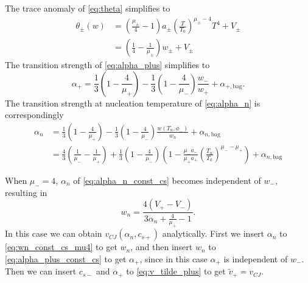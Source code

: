 The trace anomaly of \eqref{eq:theta} simplifies to
\begin{align}
\theta_\pm(w)
&= \left( \frac{\mu_\pm}{4} - 1 \right) a_\pm \left( \frac{T}{T_0} \right)^{\mu_\pm - 4} T^4 + V_\pm \\
&= \left( \frac{1}{4} - \frac{1}{\mu_\pm} \right) w_\pm + V_\pm
\label{eq:theta_const_cs}
\end{align}
The transition strength of \eqref{eq:alpha_plus} simplifies to
\begin{equation}
\alpha_+ = \frac{1}{3} \left( 1 - \frac{4}{\mu_+} \right) - \frac{1}{3} \left(1 - \frac{4}{\mu_-} \right) \frac{w_-}{w_+} + \alpha_{+,\text{bag}}.
\label{eq:alpha_plus_const_cs}
\end{equation}
The transition strength at nucleation temperature of \eqref{eq:alpha_n} is correspondingly
\begin{align}
\alpha_n &= \frac{1}{3} \left( 1 - \frac{4}{\mu_+} \right) - \frac{1}{3} \left(1 - \frac{4}{\mu_-} \right) \frac{w(T_n, \phi_-)}{w_n} + \alpha_{n,\text{bag}} \\
&= \frac{4}{3} \left( \frac{1}{\mu_-} - \frac{1}{\mu_+} \right) + \frac{1}{3} \left( 1 - \frac{4}{\mu_-} \right)
\left( 1 - \frac{\mu_- a_-}{\mu_+ a_+} \left( \frac{T_n}{T_0} \right)^{\mu_- - \mu_+} \right) + \alpha_{n,\text{bag}}
\label{eq:alpha_n_const_cs}
\end{align}
\iffalse
Inverting this gives the enthalpy at the nucleation temperature
\begin{equation}
w_n = \frac{V_+ - V_-}{ \frac{3}{4} \alpha_n + \frac{1}{\mu_+} - \frac{1}{\mu_-} }.
\label{eq:wn_const_cs}
\end{equation}
\fi
When $\mu_- = 4$, $\alpha_n$ of \eqref{eq:alpha_n_const_cs} becomes independent of $w_-$, resulting in
\begin{equation}
w_n = \frac{4 (V_+ - V_-)}{3 \alpha_n + \frac{4}{\mu_+} - 1}.
\label{eq:wn_const_cs_mu4}
\end{equation}
In this case we can obtain $v_{CJ}(\alpha_n, c_{s+})$ analytically.
First we insert $\alpha_n$ to \eqref{eq:wn_const_cs_mu4} to get $w_n$,
and then insert $w_n$ to \eqref{eq:alpha_plus_const_cs} to get $\alpha_+$,
since in this case $\alpha_+$ is independent of $w_-$.
Then we can insert $c_{s-}$ and $\alpha_+$ to \eqref{eq:v_tilde_plus} to get $\tilde{v}_+ = v_{CJ}$.

\iffalse
Now we have everything necessary to compute $\alpha_+$ and the Chapman-Jouguet speed $v_{CJ}$ analytically from $c_{s+}$, $c_{s-}$ and $\alpha_n$.
From these we get $w_n$ with \eqref{eq:wn_const_cs}, and for a detonation $w_+=w_n$.
This we can insert to \eqref{eq:wm_const_cs}, giving us $w_-$.
Now we have all the variables necessary to compute $\alpha_+$ with \eqref{eq:alpha_plus}.
Then we insert $\tilde{v}_- = c_{s-}$ to \eqref{eq:v_tilde_plus}, giving us the Chapman-Jouguet speed $v_{CJ} = v_+$.
\todo{This is wrong! We have a circular dependency and must solve the equation group at once.}
\fi

